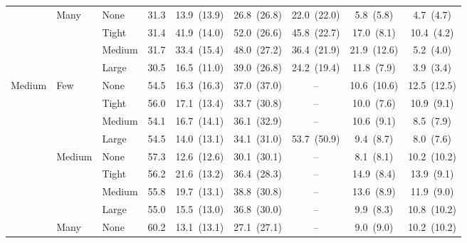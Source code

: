 \begin{table}[htbp]
{\begin{tabular}{lll c ccccc}
 & \multirow{4}{*}{\small Many} & {\small None} & 31.3 & 13.9~{\scriptsize(13.9)} & 26.8~{\scriptsize(26.8)} & 22.0~{\scriptsize(22.0)} & 5.8~{\scriptsize(5.8)} & 4.7~{\scriptsize(4.7)} \\
 &  & {\small Tight} & 31.4 & 41.9~{\scriptsize(14.0)} & 52.0~{\scriptsize(26.6)} & 45.8~{\scriptsize(22.7)} & 17.0~{\scriptsize(8.1)} & 10.4~{\scriptsize(4.2)} \\
 &  & {\small Medium} & 31.7 & 33.4~{\scriptsize(15.4)} & 48.0~{\scriptsize(27.2)} & 36.4~{\scriptsize(21.9)} & 21.9~{\scriptsize(12.6)} & 5.2~{\scriptsize(4.0)} \\
 &  & {\small Large} & 30.5 & 16.5~{\scriptsize(11.0)} & 39.0~{\scriptsize(26.8)} & 24.2~{\scriptsize(19.4)} & 11.8~{\scriptsize(7.9)} & 3.9~{\scriptsize(3.4)} \\
\midrule
\multirow{12}{*}{\small Medium} & \multirow{4}{*}{\small Few} & {\small None} & 54.5 & 16.3~{\scriptsize(16.3)} & 37.0~{\scriptsize(37.0)} & -- & 10.6~{\scriptsize(10.6)} & 12.5~{\scriptsize(12.5)} \\
 &  & {\small Tight} & 56.0 & 17.1~{\scriptsize(13.4)} & 33.7~{\scriptsize(30.8)} & -- & 10.0~{\scriptsize(7.6)} & 10.9~{\scriptsize(9.1)} \\
 &  & {\small Medium} & 54.1 & 16.7~{\scriptsize(14.1)} & 36.1~{\scriptsize(32.9)} & -- & 10.6~{\scriptsize(9.1)} & 8.5~{\scriptsize(7.9)} \\
 &  & {\small Large} & 54.5 & 14.0~{\scriptsize(13.1)} & 34.1~{\scriptsize(31.0)} & 53.7~{\scriptsize(50.9)} & 9.4~{\scriptsize(8.7)} & 8.0~{\scriptsize(7.6)} \\
 & \multirow{4}{*}{\small Medium} & {\small None} & 57.3 & 12.6~{\scriptsize(12.6)} & 30.1~{\scriptsize(30.1)} & -- & 8.1~{\scriptsize(8.1)} & 10.2~{\scriptsize(10.2)} \\
 &  & {\small Tight} & 56.2 & 21.6~{\scriptsize(13.2)} & 36.4~{\scriptsize(28.3)} & -- & 14.9~{\scriptsize(8.4)} & 13.9~{\scriptsize(9.1)} \\
 &  & {\small Medium} & 55.8 & 19.7~{\scriptsize(13.1)} & 38.8~{\scriptsize(30.8)} & -- & 13.6~{\scriptsize(8.9)} & 11.9~{\scriptsize(9.0)} \\
 &  & {\small Large} & 55.0 & 15.5~{\scriptsize(13.0)} & 36.8~{\scriptsize(30.0)} & -- & 9.9~{\scriptsize(8.3)} & 10.8~{\scriptsize(10.2)} \\
 & \multirow{4}{*}{\small Many} & {\small None} & 60.2 & 13.1~{\scriptsize(13.1)} & 27.1~{\scriptsize(27.1)} & -- & 9.0~{\scriptsize(9.0)} & 10.2~{\scriptsize(10.2)} \\

\end{tabular}}
\end{table}
